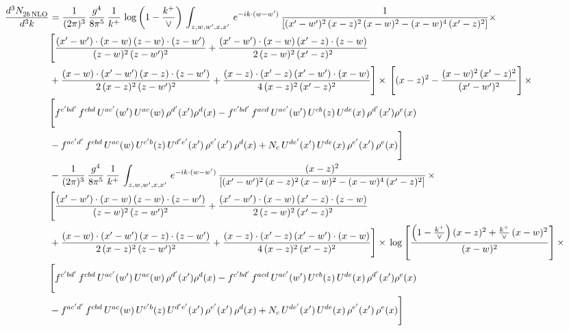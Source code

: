 \documentclass[9pt]{article}
\numberwithin{equation}{section}
\begin{document}
\begin{align}
    \frac{d^{3}N_{2b\,\rm NLO}^{\rm}}{d^{3}k}  & =  \frac{1}{(2\pi)^{3}}\, \frac{g^{4}}{8\pi^{5}}\,\frac{1}{k^{+}}\,\log{\left(1-\frac{k^{+}}{\vee}\right)}\,\int_{z,w,w^{\prime},x,x'}\, e^{-ik\cdot (w-w')}\, \frac{1}{\left[(x'-w')^{2}\,(x-z)^{2}\,(x-w)^{2} - (x-w)^{4}\, (x'-z)^{2}\right]} \times\notag \\ & \Bigg[\frac{(x'-w')\cdot (x-w)\, (z-w)\cdot (z-w')}{(z-w)^{2}\, (z-w')^{2}}+\frac{(x'-w')\cdot (x-w)\, (x'-z)\cdot (z-w)}{2\, (z-w)^{2}\, (x'-z)^{2}}\notag \\ & +\frac{(x-w)\cdot (x'-w')\, (x-z)\cdot (z-w')}{2\, (x-z)^{2}\, (z-w')^{2}}+\frac{(x-z)\cdot (x'-z)\, (x'-w')\cdot (x-w)}{4\, (x-z)^{2}\, (x'-z)^{2}}\Bigg] \times\,\Bigg[(x-z)^{2} - \frac{(x-w)^{2}\, (x'-z)^{2}}{(x'-w')^{2}}\Bigg]\,\times \notag \\ & \Bigg[f^{c'bd'}\,f^{cbd}\, U^{ac'}(w')\,U^{ac}(w)\,\rho^{d'}(x')\rho^{d}(x)- f^{c'bd'}\,f^{acd}\,U^{ac'}(w')\,U^{cb}(z)\,U^{de}(x)\,\rho^{d'}(x')\rho^{e}(x) \notag \\ & -f^{ac'd'}\,f^{cbd}\,U^{ac}(w)\,U^{c'b}(z)\,U^{d'e'}(x')\,\rho^{e'}(x')\,\rho^{d}(x) +N_{c}\,U^{de'}(x')\,U^{de}(x)\,\rho^{e'}(x')\,\rho^{e}(x)\Bigg] \notag \\
&  - \frac{1}{(2\pi)^{3}}\, \frac{g^{4}}{8\pi^{5}}\,\frac{1}{k^{+}}\,\int_{z,w,w^{\prime},x,x'}\, e^{-ik\cdot (w-w')}\, \frac{(x-z)^{2}}{\left[(x'-w')^{2}\,(x-z)^{2}\,(x-w)^{2} - (x-w)^{4}\, (x'-z)^{2}\right]}\,  \times\notag \\ & \Bigg[\frac{(x'-w')\cdot (x-w)\, (z-w)\cdot (z-w')}{(z-w)^{2}\, (z-w')^{2}}+\frac{(x'-w')\cdot (x-w)\, (x'-z)\cdot (z-w)}{2\, (z-w)^{2}\, (x'-z)^{2}}\notag \\ & +\frac{(x-w)\cdot (x'-w')\, (x-z)\cdot (z-w')}{2\, (x-z)^{2}\, (z-w')^{2}}+\frac{(x-z)\cdot (x'-z)\, (x'-w')\cdot (x-w)}{4\, (x-z)^{2}\, (x'-z)^{2}}\Bigg] \times\,\log{\left[\frac{\left(1-\frac{k^{+}}{\vee}\right)(x-z)^{2}+\frac{k^{+}}{\vee}\,(x-w)^{2}}{(x-w)^{2}}\right]}\,\times \notag \\ & \Bigg[f^{c'bd'}\,f^{cbd}\, U^{ac'}(w')\,U^{ac}(w)\,\rho^{d'}(x')\rho^{d}(x)- f^{c'bd'}\,f^{acd}\,U^{ac'}(w')\,U^{cb}(z)\,U^{de}(x)\,\rho^{d'}(x')\rho^{e}(x) \notag \\ & -f^{ac'd'}\,f^{cbd}\,U^{ac}(w)\,U^{c'b}(z)\,U^{d'e'}(x')\,\rho^{e'}(x')\,\rho^{d}(x) +N_{c}\,U^{de'}(x')\,U^{de}(x)\,\rho^{e'}(x')\,\rho^{e}(x)\Bigg] \notag \\

\end{align}
\end{document}
